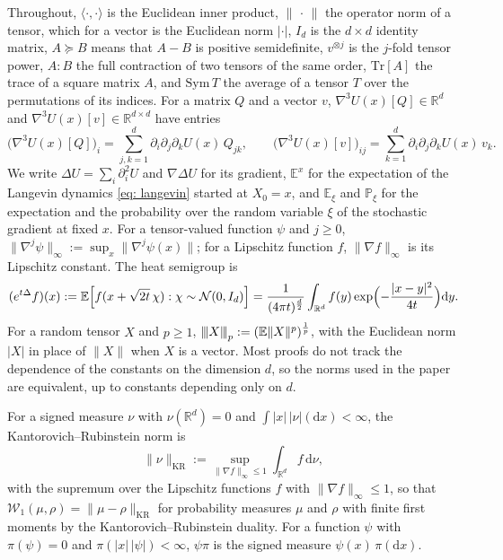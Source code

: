 \documentclass{article}
\newcommand{\Le}{\leqslant}
\newcommand{\Ge}{\geqslant}
\newcommand{\D}{\mathrm{d}}
\newcommand{\norm}[1]{\lVert #1 \rVert}
\newcommand{\pnorm}[1]{{\vert\kern-0.25ex\vert\kern-0.25ex\vert} #1 {\vert\kern-0.25ex\vert\kern-0.25ex\vert}}
\numberwithin{equation}{section}
\begin{document}
Throughout, $\langle \cdot , \cdot \rangle$ is the Euclidean inner product, $\norm{\,\cdot\,}$ the operator norm of a tensor, which for a vector is the Euclidean norm $|\cdot|$, $I_d$ is the $d \times d$ identity matrix, $A \succeq B$ means that $A - B$ is positive semidefinite, $v^{\otimes j}$ is the $j$-fold tensor power, $A : B$ the full contraction of two tensors of the same order, $\mathrm{Tr}[A]$ the trace of a square matrix $A$, and $\mathrm{Sym}\, T$ the average of a tensor $T$ over the permutations of its indices. For a matrix $Q$ and a vector $v$, $\nabla^3 U(x)[Q] \in \mathbb R^d$ and $\nabla^3 U(x)[v] \in \mathbb R^{d\times d}$ have entries
\begin{equation*}
    \bigl( \nabla^3 U(x)[Q] \bigr)_i = \sum_{j,k=1}^d \partial_i\partial_j\partial_k U(x)\, Q_{jk} , \qquad
    \bigl( \nabla^3 U(x)[v] \bigr)_{ij} = \sum_{k=1}^d \partial_i\partial_j\partial_k U(x)\, v_k .
\end{equation*}
We write $\Delta U = \sum_i \partial_i^2 U$ and $\nabla \Delta U$ for its gradient, $\mathbb E^x$ for the expectation of the Langevin dynamics \eqref{eq: langevin} started at $X_0 = x$, and $\mathbb E_\xi$ and $\mathbb P_\xi$ for the expectation and the probability over the random variable $\xi$ of the stochastic gradient at fixed $x$. For a tensor-valued function $\psi$ and $j \Ge 0$, $\norm{\nabla^j \psi}_\infty := \sup_x \norm{\nabla^j \psi(x)}$; for a Lipschitz function $f$, $\norm{\nabla f}_\infty$ is its Lipschitz constant. The heat semigroup is
\begin{equation*}
	(e^{t\Delta} f)(x) := \mathbb E\Bigl[ f( x + \sqrt{2t}\, \chi ):\chi \sim \mathcal N(0, I_d) \Bigr] = \frac{1}{(4\pi t)^{\frac d2}} \int_{\mathbb R^d} f(y) \exp\Bigl( -\frac{|x-y|^2}{4t} \Bigr) \D y .
\end{equation*}
For a random tensor $X$ and $p \Ge 1$, $\pnorm{X}_p := ( \mathbb E \norm{X}^p )^{\frac1p}$, with the Euclidean norm $|X|$ in place of $\norm{X}$ when $X$ is a vector. Most proofs do not track the dependence of the constants on the dimension $d$, so the norms used in the paper are equivalent, up to constants depending only on $d$.

For a signed measure $\nu$ with $\nu(\mathbb R^d) = 0$ and $\int |x|\, |\nu|(\D x) < \infty$, the Kantorovich--Rubinstein norm is
\begin{equation*}
    \norm{\nu}_{\mathrm{KR}} := \sup_{\norm{\nabla f}_\infty \Le 1} \int_{\mathbb R^d} f\, \D\nu ,
\end{equation*}
with the supremum over the Lipschitz functions $f$ with $\norm{\nabla f}_\infty \Le 1$, so that $\mathcal W_1(\mu, \rho) = \norm{\mu - \rho}_{\mathrm{KR}}$ for probability measures $\mu$ and $\rho$ with finite first moments by the Kantorovich--Rubinstein duality. For a function $\psi$ with $\pi(\psi) = 0$ and $\pi(|x|\,|\psi|) < \infty$, $\psi\pi$ is the signed measure $\psi(x)\, \pi(\D x)$.
\end{document}
